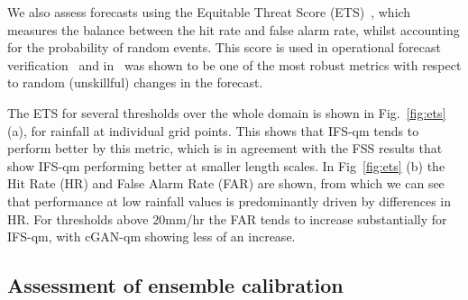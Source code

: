 \documentclass{article}
\begin{document}
We also assess forecasts using the Equitable Threat Score (ETS)~\citep{schaefer_critical_1990, wilks_forecast_2019}, which measures the balance between the hit rate and false alarm rate, whilst accounting for the probability of random events. This score is used in operational forecast verification~\citep{mittermaier_long-term_2013} and in~\cite{manzato_behaviour_2017} was shown to be one of the most robust metrics with respect to random (unskillful) changes in the forecast.

The ETS for several thresholds over the whole domain is shown in Fig.~\ref{fig:ets} (a), for rainfall at individual grid points. This shows that IFS-qm tends to perform better by this metric, which is in agreement with the FSS results that show IFS-qm performing better at smaller length scales. In Fig~\ref{fig:ets} (b) the Hit Rate (HR) and False Alarm Rate (FAR) are shown, from which we can see that performance at low rainfall values is predominantly driven by differences in HR. For thresholds above 20mm/hr the FAR tends to increase substantially for IFS-qm, with cGAN-qm showing less of an increase.

        
\subsection{Assessment of ensemble calibration}
\label{sec:ens_calib}
\end{document}
